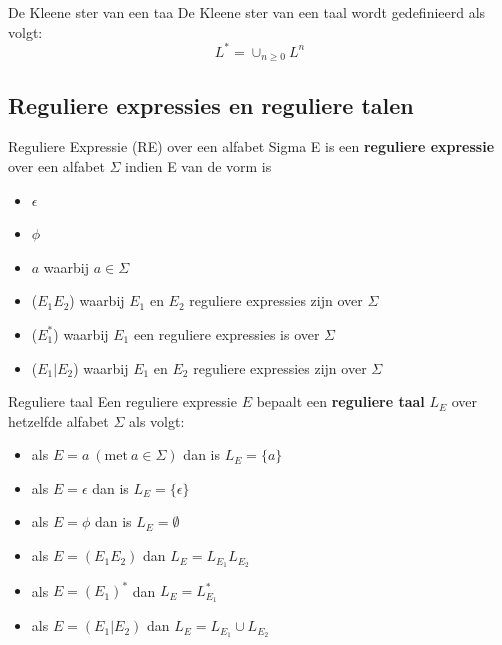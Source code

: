 \begin{pro}{De Kleene ster van een taa}
    De Kleene ster van een taal wordt gedefinieerd als volgt:
    \begin{equation*}
        L^* = \cup_{n \geq 0}L^n
    \end{equation*}
    \vspace{-0.5cm}
\end{pro}

\newpage

\subsection{Reguliere expressies en reguliere talen}

\vspace{0.5cm}

\begin{theo}{Reguliere Expressie (RE) over een alfabet Sigma}
    E is een \textbf{reguliere expressie} over een alfabet $\Sigma$ indien E van de vorm is
    \begin{itemize}
        \item $\epsilon$
        \item $\phi$
        \item $a$ waarbij $a \in \Sigma$
        \item ($E_{1}E_{2}$) waarbij $E_1$ en $E_2$ reguliere expressies zijn over $\Sigma$
        \item ($E_{1}^*$) waarbij $E_1$ een reguliere expressies is over $\Sigma$
        \item ($E_{1}|E_{2}$) waarbij $E_1$ en $E_2$ reguliere expressies zijn over $\Sigma$
    \end{itemize}
    \vspace{-0.3cm}
\end{theo}

\begin{theo}{Reguliere taal}
    Een reguliere expressie $E$ bepaalt een \textbf{reguliere taal} $L_E$ over hetzelfde alfabet $\Sigma$ als volgt:
    \begin{itemize}
        \item als $E = a \ (\text{met} \ a \in \Sigma)$ dan is $L_E = \{a\}$
        \item als $E = \epsilon$ dan is $L_E = \{\epsilon\}$
        \item als $E = \phi$ dan is $L_E = \emptyset$
        \item als $E = (E_{1}E_{2})$ dan $L_E = L_{E_1}L_{E_2}$
        \item als $E = {(E_{1})}^{*}$ dan $L_E = L_{E_1}^*$
        \item als $E = (E_{1}|E_{2})$ dan $L_E = L_{E_1} \cup L_{E_2}$
    \end{itemize}
    \vspace{-0.3cm}
\end{theo}

